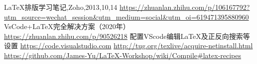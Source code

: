\documentclass[10pt, UTF8]{ctexart}%
\begin{document}
    


    
    \begin{thebibliography}{123456}%
         \LaTeX 排版学习笔记,Zoho,2013,10,14
         \url{https://zhuanlan.zhihu.com/p/106167792?utm_source=wechat_session&utm_medium=social&utm_oi=619471395880960}
        \newline VsCode+\LaTeX 完全解决方案（2020年）
         \url{https://zhuanlan.zhihu.com/p/90526218}
        \newline 配置VScode编辑\LaTeX 及正反向搜索等设置
          \url{https://code.visualstudio.com}
         \url{http://tug.org/texlive/acquire-netinstall.html}
         \url{https://github.com/James-Yu/LaTeX-Workshop/wiki/Compile#latex-recipes}

    \end{thebibliography}
\end{document}
